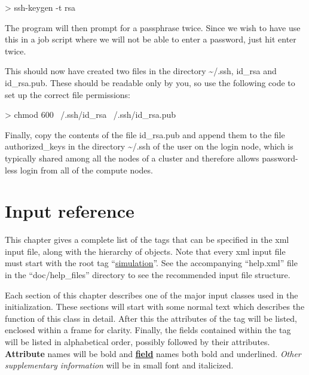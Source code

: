 \documentclass[11pt,english,fleqn]{report}
\newenvironment{code}{%
\footnotesize 
\verbatim
}{
\endverbatim
\normalsize
}
\begin{document}
\begin{code}
> ssh-keygen -t rsa
\end{code}

\noindent The program will then prompt for a passphrase twice. Since we wish to have
use this in a job script where we will not be able to enter a password,
just hit enter twice. 

This should now have created two files in the directory \textasciitilde{}/.ssh,
id\_rsa and id\_rsa.pub. These should be readable only by you, so
use the following code to set up the correct file permissions:

\begin{code}
> chmod 600 ~/.ssh/id_rsa ~/.ssh/id_rsa.pub
\end{code}

\noindent Finally, copy the contents of the file id\_rsa.pub and append them
to the file authorized\_keys in the directory \textasciitilde{}/.ssh
of the user on the login node, which is typically shared among all
the nodes of a cluster and therefore allows password-less login 
from all of the compute nodes.


\chapter{Input reference}

\label{hierarchy}

This chapter gives a complete list of the tags that can be
specified in the xml input file, along with the hierarchy of objects.
Note that every xml input file must start with the root tag 
{}``\hyperref[SIMULATION]{simulation}''. 
See the accompanying {}``help.xml'' file in the {}``doc/help\_files'' directory
to see the recommended input file structure.

Each section of this chapter describes one of the major input classes
used in the \ipi initialization. These sections will start with some normal
text which describes the function of this class in detail.
After this the attributes of the tag will be listed, enclosed within
a frame for clarity.
Finally, the fields contained within the tag will be listed in alphabetical order,
possibly followed by their attributes.
\textbf{Attribute} names will be bold and 
\textbf{\underline{field}} names both bold and underlined.
\emph{\small Other supplementary information} will be in small font and italicized.
\end{document}
